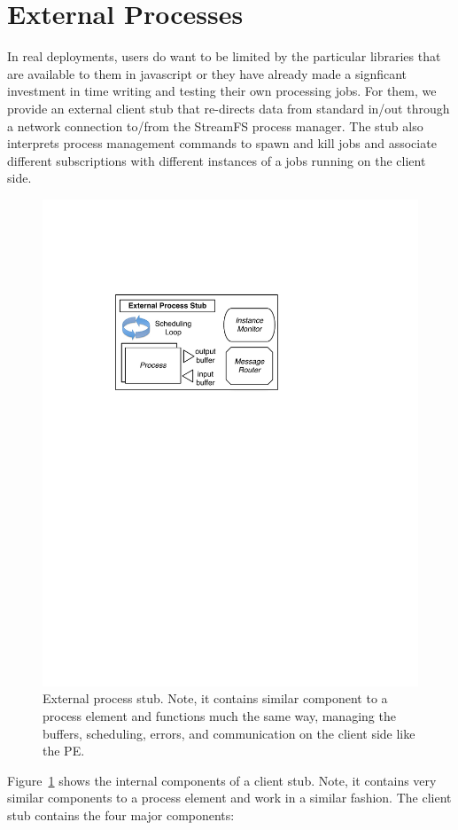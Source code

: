 \section{External Processes}
\label{sec:externalprocs}

In real deployments, %
users do want to be limited by the particular libraries that are available to them in javascript or they have already made
a signficant investment in time writing and testing their own processing jobs.  For them, we provide an external client stub that 
re-directs data from standard in/out through a network connection to/from the StreamFS process manager.  The stub also interprets
process management commands to spawn and kill jobs and associate different subscriptions with different instances of a jobs 
running on the client side.

\begin{figure}[h!] %
\centering
\includegraphics[width=0.55\columnwidth]{figs/external_stub}
\caption{External process stub.  Note, it contains similar component to a process element and functions much the same way, 
managing the buffers, scheduling, errors, and communication on the client side like the PE.}
\label{fig:external_stub}
\end{figure}

Figure~\ref{fig:external_stub} shows the internal components of a client stub.  Note, it contains very similar components to
a process element and work in a similar fashion.  The client stub contains the four major components:


